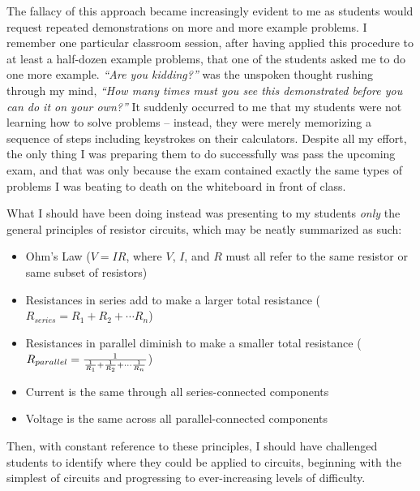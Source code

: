 The fallacy of this approach became increasingly evident to me as students would request repeated demonstrations on more and more example problems.  I remember one particular classroom session, after having applied this procedure to at least a half-dozen example problems, that one of the students asked me to do one more example.  \textit{``Are you kidding?''} was the unspoken thought rushing through my mind, \textit{``How many times must you see this demonstrated before you can do it on your own?''}  It suddenly occurred to me that my students were not learning how to solve problems -- instead, they were merely memorizing a sequence of steps including keystrokes on their calculators.  Despite all my effort, the only thing I was preparing them to do successfully was pass the upcoming exam, and that was only because the exam contained exactly the same types of problems I was beating to death on the whiteboard in front of class.

\vskip 10pt

\filbreak

What I should have been doing instead was presenting to my students \textit{only} the general principles of resistor circuits, which may be neatly summarized as such:

\begin{itemize}
\item Ohm's Law ($V = IR$, where $V$, $I$, and $R$ must all refer to the same resistor or same subset of resistors)
\item Resistances in series add to make a larger total resistance ($R_{series} = R_1 + R_2 + \cdots R_n$)
\item Resistances in parallel diminish to make a smaller total resistance ($R_{parallel} = {1 \over {1 \over R_1} + {1 \over R_2} + \cdots {1 \over R_n}}$)
\item Current is the same through all series-connected components
\item Voltage is the same across all parallel-connected components
\end{itemize}

Then, with constant reference to these principles, I should have challenged students to identify where they could be applied to circuits, beginning with the simplest of circuits and progressing to ever-increasing levels of difficulty.

\vskip 10pt

